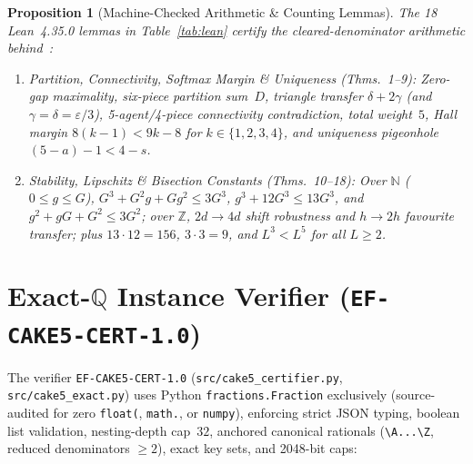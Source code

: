 \documentclass[10pt,twocolumn]{article}
\newtheorem{proposition}{Proposition}
\newcommand{\QQ}{\mathbb{Q}}
\newcommand{\ZZ}{\mathbb{Z}}
\newcommand{\NN}{\mathbb{N}}
\begin{document}
\begin{proposition}[Machine-Checked Arithmetic \& Counting Lemmas]\label{prop:lean}
The 18 Lean~4.35.0 lemmas in Table~\ref{tab:lean} certify the cleared-denominator arithmetic behind~\cite{filosratsikas2026envyfree5}:
\begin{enumerate}[leftmargin=*,nosep]
  \item \emph{Partition, Connectivity, Softmax Margin \& Uniqueness (Thms.~1--9):} Zero-gap maximality, six-piece partition sum~$D$, triangle transfer $\delta+2\gamma$ (and $\gamma=\delta=\varepsilon/3$), 5-agent/4-piece connectivity contradiction, total weight~$5$, Hall margin $8(k-1) < 9k-8$ for $k\in\{1,2,3,4\}$, and uniqueness pigeonhole $(5-a)-1 < 4-s$.
  \item \emph{Stability, Lipschitz \& Bisection Constants (Thms.~10--18):} Over $\NN$ ($0 \le g \le G$), $G^3 + G^2 g + G g^2 \le 3 G^3$, $g^3 + 12 G^3 \le 13 G^3$, and $g^2 + g G + G^2 \le 3 G^2$; over $\ZZ$, $2d \to 4d$ shift robustness and $h \to 2h$ favourite transfer; plus $13\cdot 12 = 156$, $3\cdot 3 = 9$, and $L^3 < L^5$ for all $L \ge 2$.
\end{enumerate}
\end{proposition}

\section{Exact-\texorpdfstring{$\QQ$}{Q} Instance Verifier (\texttt{EF-CAKE5-CERT-1.0})}\label{sec:cert}
The verifier \texttt{EF-CAKE5-CERT-1.0} (\texttt{src/cake5\_certifier.py}, \texttt{src/cake5\_exact.py}) uses Python \texttt{fractions.Fraction} exclusively (source-audited for zero \texttt{float(}, \texttt{math.}, or \texttt{numpy}), enforcing strict JSON typing, boolean list validation, nesting-depth cap~$32$, anchored canonical rationals (\texttt{\textbackslash A...\textbackslash Z}, reduced denominators $\ge 2$), exact key sets, and 2048-bit caps:
\end{document}
